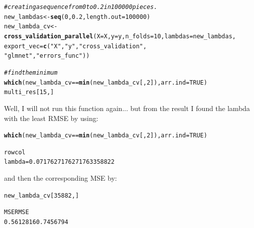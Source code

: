 \documentclass[11pt, a4paper, english]{article}\usepackage[]{graphicx}\usepackage[dvipsnames]{xcolor}
\makeatletter
\newcommand{\hlnum}[1]{\textcolor[rgb]{0.686,0.059,0.569}{#1}}%
\newcommand{\hlstr}[1]{\textcolor[rgb]{0.192,0.494,0.8}{#1}}%
\newcommand{\hlcom}[1]{\textcolor[rgb]{0.678,0.584,0.686}{\textit{#1}}}%
\newcommand{\hlopt}[1]{\textcolor[rgb]{0,0,0}{#1}}%
\newcommand{\hlstd}[1]{\textcolor[rgb]{0.345,0.345,0.345}{#1}}%
\newcommand{\hlkwb}[1]{\textcolor[rgb]{0.69,0.353,0.396}{#1}}%
\newcommand{\hlkwc}[1]{\textcolor[rgb]{0.333,0.667,0.333}{#1}}%
\newcommand{\hlkwd}[1]{\textcolor[rgb]{0.737,0.353,0.396}{\textbf{#1}}}%
\newenvironment{kframe}{%
 \def\at@end@of@kframe{}%
 \ifinner\ifhmode%
  \def\at@end@of@kframe{\end{minipage}}%
  \begin{minipage}{\columnwidth}%
 \fi\fi%
 \def\FrameCommand##1{\hskip\@totalleftmargin \hskip-\fboxsep
 \colorbox{shadecolor}{##1}\hskip-\fboxsep
     \hskip-\linewidth \hskip-\@totalleftmargin \hskip\columnwidth}%
 \MakeFramed {\advance\hsize-\width
   \@totalleftmargin\z@ \linewidth\hsize
   \@setminipage}}%
 {\par\unskip\endMakeFramed%
 \at@end@of@kframe}
\newenvironment{knitrout}{}{} %
\makeatother
\begin{document}
\begin{knitrout}
\color{fgcolor}\begin{kframe}
\begin{alltt}
\hlcom{#creating a sequence from 0 to 0.2 in 100 000 pieces. }
\hlstd{new_lambdas} \hlkwb{<-} \hlkwd{seq}\hlstd{(}\hlnum{0}\hlstd{,}\hlnum{0.2}\hlstd{,} \hlkwc{length.out} \hlstd{=} \hlnum{100000}\hlstd{)}
\hlstd{new_lambda_cv} \hlkwb{<-} \hlkwd{cross_validation_parallel}\hlstd{(}\hlkwc{X}\hlstd{=X,} \hlkwc{y}\hlstd{=y,} \hlkwc{n_folds}\hlstd{=}\hlnum{10}\hlstd{,} \hlkwc{lambdas}\hlstd{=new_lambdas,}
                          \hlkwc{export_vec} \hlstd{=} \hlkwd{c}\hlstd{(}\hlstr{"X"}\hlstd{,} \hlstr{"y"}\hlstd{,} \hlstr{"cross_validation"}\hlstd{,}
                                         \hlstr{"glmnet"}\hlstd{,} \hlstr{"errors_func"}\hlstd{) )}

\hlcom{#find the minimum}
\hlkwd{which}\hlstd{(new_lambda_cv} \hlopt{==} \hlkwd{min}\hlstd{(new_lambda_cv[,}\hlnum{2}\hlstd{]),} \hlkwc{arr.ind} \hlstd{=} \hlnum{TRUE}\hlstd{)}
\hlstd{multi_res[}\hlnum{15}\hlstd{,]}
\end{alltt}
\end{kframe}
\end{knitrout}

Well, I will not run this function again... but from the result I found the lambda with the least RMSE by using:
\begin{knitrout}
\color{fgcolor}\begin{kframe}
\begin{alltt}
\hlkwd{which}\hlstd{(new_lambda_cv} \hlopt{==} \hlkwd{min}\hlstd{(new_lambda_cv[,}\hlnum{2}\hlstd{]),} \hlkwc{arr.ind} \hlstd{=} \hlnum{TRUE}\hlstd{)}
\end{alltt}
\end{kframe}
\end{knitrout}

\begin{knitrout}
\color{fgcolor}\begin{kframe}
\begin{alltt}
                               row col
lambda =  0.0717627176271763 35882   2
\end{alltt}
\end{kframe}
\end{knitrout}

and then the corresponding MSE by:
\begin{knitrout}
\color{fgcolor}\begin{kframe}
\begin{alltt}
new_lambda_cv[35882,]

 MSE      RMSE 
0.5612816 0.7456794 
\end{alltt}
\end{kframe}
\end{knitrout}
\end{document}
